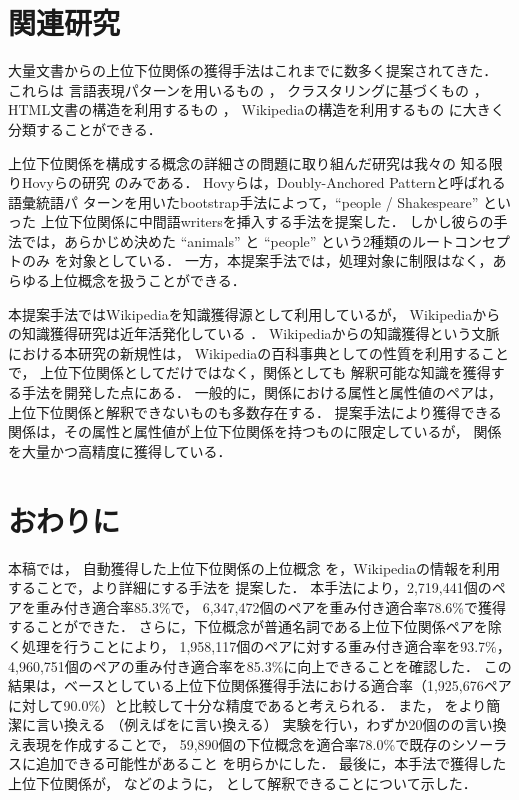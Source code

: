 \documentclass[japanese]{jnlp_1.4}
\newcommand{\thype}{}
\newcommand{\ghype}{}
\newcommand{\xmp}[1]{}
\newcommand{\attval}[3]{}
\begin{document}
\section{関連研究 \label{sec:related-word}}

大量文書からの上位下位関係の獲得手法はこれまでに数多く提案されてきた．
これらは
言語表現パターンを用いるもの
\cite{hearst92,ando04}，
クラスタリングに基づくもの
\cite{pantel04,etzioni05}，
HTML文書の構造を利用するもの
\cite{shinzato04}，
Wikipediaの構造を利用するもの
\cite{隅田:吉永:鳥澤:2009,oh09,Yamada:EMNLP:2009}
に大きく分類することができる．

上位下位関係を構成する概念の詳細さの問題に取り組んだ研究は我々の
知る限りHovyらの研究 \cite{hovy09}のみである．
Hovyらは，Doubly-Anchored Patternと呼ばれる語彙統語パ
ターンを用いたbootstrap手法によって，``people / Shakespeare'' といった
上位下位関係に中間語writersを挿入する手法を提案した．
しかし彼らの手法では，あらかじめ決めた ``animals'' と ``people'' という2種類のルートコンセプトのみ
を対象としている．
一方，本提案手法では，処理対象に制限はなく，あらゆる上位概念を扱うことができる．


本提案手法ではWikipediaを知識獲得源として利用しているが，
Wikipediaからの知識獲得研究は近年活発化している
\cite{kazama07,ponzetto07,suchanek07,nastase08,
隅田:吉永:鳥澤:2009,oh09,Yamada:EMNLP:2009}．
Wikipediaからの知識獲得という文脈における本研究の新規性は，
Wikipediaの百科事典としての性質を利用することで，
上位下位関係としてだけではなく，\attval{対象}{属性}{属性値}関係としても
解釈可能な知識を獲得する手法を開発した点にある．
一般的に，\attval{対象}{属性}{属性値}関係における属性と属性値のペアは，上位下位関係と解釈できないものも多数存在する．
提案手法により獲得できる\attval{対象}{属性}{属性値}関係は，その属性と属性値が上位下位関係を持つものに限定しているが，
\attval{対象}{属性}{属性値}関係を大量かつ高精度に獲得している．


\section{おわりに \label{sec:conclusion}}

本稿では，
自動獲得した上位下位関係の上位概念
を，Wikipediaの情報を利用することで，より詳細にする手法を
提案した．
本手法により，2,719,441個の\thype{}ペアを重み付き適合率85.3\%で，
6,347,472個の\ghype{}ペアを重み付き適合率78.6\%で獲得することができた．
さらに，下位概念が普通名詞である上位下位関係ペアを除く処理を行うことにより，
1,958,117個の\thype{}ペアに対する重み付き適合率を93.7\%，
4,960,751個の\ghype{}ペアの重み付き適合率を85.3\%に向上できることを確認した．
この結果は，ベースとしている上位下位関係獲得手法\cite{隅田:吉永:鳥澤:2009}における適合率（1,925,676ペアに対して90.0\%）と比較して十分な精度であると考えられる．
また，
\ghype{}をより簡潔に言い換える
（例えば\xmp{映画監督の作品}を\xmp{映画}に言い換える）
実験を行い，わずか20個の\ghype{}の言い換え表現を作成することで，
59,890個の下位概念を適合率78.0\%で既存のシソーラスに追加できる可能性があること
を明らかにした．
最後に，本手法で獲得した上位下位関係が，
\attval{黒澤明}{作品}{七人の侍}などのように，
\attval{対象}{属性}{属性値}として解釈できることについて示した．
\end{document}
